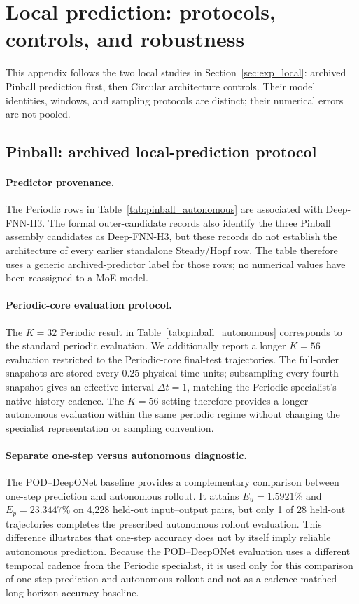 \section{Local prediction: protocols, controls, and robustness}
\label{app:local_evidence}

This appendix follows the two local studies in Section~\ref{sec:exp_local}:
archived Pinball prediction first, then Circular architecture controls.
Their model identities, windows, and sampling protocols are distinct;
their numerical errors are not pooled.

\subsection{Pinball: archived local-prediction protocol}
\label{app:pinball}

\paragraph{Predictor provenance.}
The Periodic rows in Table~\ref{tab:pinball_autonomous} are associated
with Deep-FNN-H3. The formal outer-candidate records also identify the
three Pinball assembly candidates as Deep-FNN-H3, but these records do
not establish the architecture of every earlier standalone Steady/Hopf
row. The table therefore uses a generic archived-predictor label for
those rows; no numerical values have been reassigned to a MoE model.

\paragraph{Periodic-core evaluation protocol.}
The $K=32$ Periodic result in Table~\ref{tab:pinball_autonomous} corresponds to the standard periodic evaluation. We additionally report a longer $K=56$ evaluation restricted to the Periodic-core final-test trajectories. The full-order snapshots are stored every $0.25$ physical time units; subsampling every fourth snapshot gives an effective interval $\Delta t=1$, matching the Periodic specialist's native history cadence. The $K=56$ setting therefore provides a longer autonomous evaluation within the same periodic regime without changing the specialist representation or
sampling convention.

\paragraph{Separate one-step versus autonomous diagnostic.}
The POD--DeepONet baseline provides a complementary comparison between
one-step prediction and autonomous rollout. It attains $E_u=1.5921\%$ and $E_p=23.3447\%$ on 4,228 held-out input--output pairs, but only 1 of 28 held-out trajectories completes the prescribed autonomous rollout evaluation. This difference illustrates that one-step accuracy does not by itself imply reliable autonomous prediction. Because the POD--DeepONet evaluation uses a different temporal cadence from
the Periodic specialist, it is used only for this comparison of one-step prediction and autonomous rollout and not as a cadence-matched long-horizon accuracy baseline.

